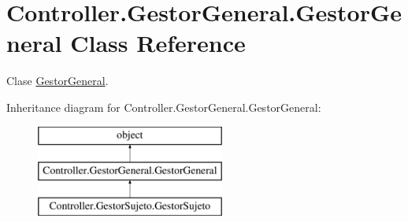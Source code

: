 \hypertarget{class_controller_1_1_gestor_general_1_1_gestor_general}{}\section{Controller.\+Gestor\+General.\+Gestor\+General Class Reference}
\label{class_controller_1_1_gestor_general_1_1_gestor_general}


Clase \hyperlink{class_controller_1_1_gestor_general_1_1_gestor_general}{Gestor\+General}.  


Inheritance diagram for Controller.\+Gestor\+General.\+Gestor\+General\+:\begin{figure}[H]
\begin{center}
\leavevmode
\includegraphics[height=3.000000cm]{class_controller_1_1_gestor_general_1_1_gestor_general}
\end{center}
\end{figure}
